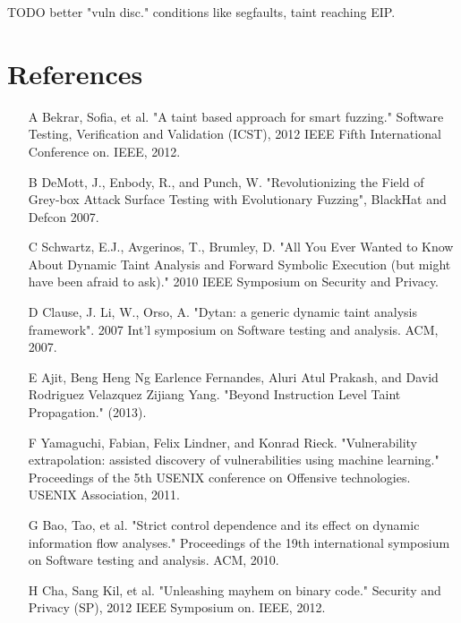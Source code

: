 \documentclass[11pt,expanded,copyright]{fsuthesis}
\begin{document}
TODO better "vuln disc." conditions like segfaults, taint reaching EIP.





\chapter{References}

\begin{itemize}
	\item [A] Bekrar, Sofia, et al. "A taint based approach for smart fuzzing." Software Testing, Verification and Validation (ICST), 2012 IEEE Fifth International Conference on. IEEE, 2012.
	\item [B] DeMott, J., Enbody, R., and Punch, W. "Revolutionizing the Field of Grey-box Attack Surface Testing with Evolutionary Fuzzing", BlackHat and Defcon 2007.
	\item [C] Schwartz, E.J., Avgerinos, T., Brumley, D. "All You Ever Wanted to Know About Dynamic Taint Analysis and Forward Symbolic Execution (but might have been afraid to ask)." 2010 IEEE Symposium on Security and Privacy.
	\item [D] Clause, J. Li, W., Orso, A. "Dytan: a generic dynamic taint analysis framework". 2007 Int'l symposium on Software testing and analysis. ACM, 2007.
	\item [E] Ajit, Beng Heng Ng Earlence Fernandes, Aluri Atul Prakash, and David Rodriguez Velazquez Zijiang Yang. "Beyond Instruction Level Taint Propagation." (2013).
	\item [F] Yamaguchi, Fabian, Felix Lindner, and Konrad Rieck. "Vulnerability extrapolation: assisted discovery of vulnerabilities using machine learning." Proceedings of the 5th USENIX conference on Offensive technologies. USENIX Association, 2011.
	\item [G] Bao, Tao, et al. "Strict control dependence and its effect on dynamic information flow analyses." Proceedings of the 19th international symposium on Software testing and analysis. ACM, 2010.
	\item [H] Cha, Sang Kil, et al. "Unleashing mayhem on binary code." Security and Privacy (SP), 2012 IEEE Symposium on. IEEE, 2012.

\end{itemize}
\end{document}
